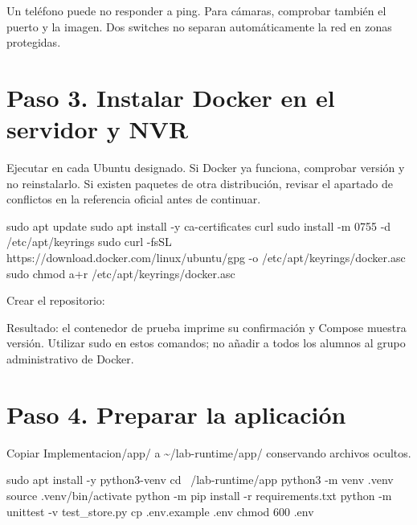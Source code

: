\documentclass[12pt,a4paper]{article}
\begin{document}
Un teléfono puede no responder a ping. Para cámaras, comprobar también el puerto y la imagen. Dos switches no separan automáticamente la red en zonas protegidas.\par
{}\section*{Paso 3. Instalar Docker en el servidor y NVR}
Ejecutar en cada Ubuntu designado. Si Docker ya funciona, comprobar versión y no reinstalarlo. Si existen paquetes de otra distribución, revisar el apartado de conflictos en la referencia oficial antes de continuar.\par
{}
\begin{Comandos}
sudo apt update
sudo apt install -y ca-certificates curl
sudo install -m 0755 -d /etc/apt/keyrings
sudo curl -fsSL https://download.docker.com/linux/ubuntu/gpg -o /etc/apt/keyrings/docker.asc
sudo chmod a+r /etc/apt/keyrings/docker.asc
\end{Comandos}
Crear el repositorio:\par
{}
Resultado: el contenedor de prueba imprime su confirmación y Compose muestra versión. Utilizar \textnormal{sudo} en estos comandos; no añadir a todos los alumnos al grupo administrativo de Docker.\par
{}\section*{Paso 4. Preparar la aplicación}
Copiar \textnormal{Implementacion/\allowbreak{}app/\allowbreak{}} a \textnormal{\textasciitilde{}/\allowbreak{}lab-runtime/\allowbreak{}app/\allowbreak{}} conservando archivos ocultos.\par
{}
\begin{Comandos}
sudo apt install -y python3-venv
cd ~/lab-runtime/app
python3 -m venv .venv
source .venv/bin/activate
python -m pip install -r requirements.txt
python -m unittest -v test_store.py
cp .env.example .env
chmod 600 .env
\end{Comandos}
\end{document}
